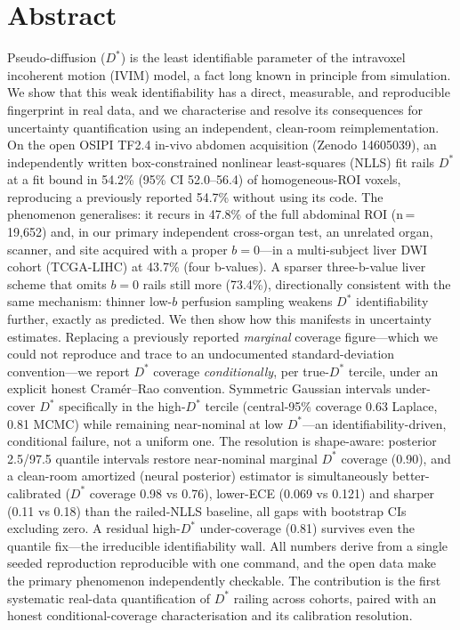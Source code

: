 \documentclass[11pt]{article}
\newcommand{\Dstar}{\ensuremath{D^{*}}}
\begin{document}
\vspace{0.5em}

\section*{Abstract}

\noindent Pseudo-diffusion (\Dstar{}) is the least identifiable parameter of the
intravoxel incoherent motion (IVIM) model, a fact long known in principle from
simulation. We show that this weak identifiability has a direct, measurable, and
reproducible fingerprint in real data, and we characterise and resolve its
consequences for uncertainty quantification using an independent, clean-room
reimplementation. On the open OSIPI TF2.4 in-vivo abdomen acquisition (Zenodo
14605039), an independently written box-constrained nonlinear least-squares (NLLS) fit
rails \Dstar{} at a fit bound in 54.2\% (95\% CI 52.0--56.4) of homogeneous-ROI
voxels, reproducing a previously reported 54.7\% without using its code. The phenomenon
generalises: it recurs in 47.8\% of the full abdominal ROI (n\,=\,19{,}652) and, in our
primary independent cross-organ test, an unrelated organ, scanner, and site acquired with
a proper $b=0$---in a multi-subject liver DWI cohort (TCGA-LIHC) at 43.7\% (four
b-values). A sparser three-b-value liver scheme that omits $b=0$ rails still more
(73.4\%), directionally consistent with the same mechanism: thinner low-$b$ perfusion
sampling weakens \Dstar{} identifiability further, exactly as predicted. We then show how this manifests in uncertainty estimates. Replacing a
previously reported \emph{marginal} coverage figure---which we could not reproduce and
trace to an undocumented standard-deviation convention---we report \Dstar{} coverage
\emph{conditionally}, per true-\Dstar{} tercile, under an explicit honest
Cram\'er--Rao convention. Symmetric Gaussian intervals under-cover \Dstar{} specifically
in the high-\Dstar{} tercile (central-95\% coverage 0.63 Laplace, 0.81 MCMC) while
remaining near-nominal at low \Dstar{}---an identifiability-driven, conditional failure,
not a uniform one. The resolution is shape-aware: posterior 2.5/97.5 quantile intervals
restore near-nominal marginal \Dstar{} coverage (0.90), and a clean-room amortized
(neural posterior) estimator is simultaneously better-calibrated (\Dstar{} coverage 0.98
vs 0.76), lower-ECE (0.069 vs 0.121) and sharper (0.11 vs 0.18) than the railed-NLLS
baseline, all gaps with bootstrap CIs excluding zero. A residual high-\Dstar{}
under-coverage (0.81) survives even the quantile fix---the irreducible identifiability
wall. All numbers derive from a single seeded reproduction reproducible with one
command, and the open data make the primary phenomenon independently checkable. The
contribution is the first systematic real-data quantification of \Dstar{} railing across
cohorts, paired with an honest conditional-coverage characterisation and its calibration
resolution.
\end{document}
